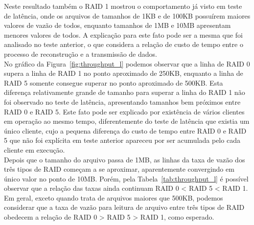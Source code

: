 	Neste resultado também o RAID 1 mostrou o comportamento já visto em teste de latência, onde os arquivos de tamanhos de 1KB e de 100KB possuírem maiores valores de vazão de todos, enquanto tamanhos de 1MB e 10MB apresentam menores valores de todos. A explicação para este fato pode ser a mesma que foi analisado no teste anterior, o que considera a relação de custo de tempo entre o processo de reconstrução e a transmissão de dados.
	\\
	
	No gráfico da Figura~\ref{fig:throughput_l} podemos observar que a linha de RAID 0 supera a linha de RAID 1 no ponto aproximado de 250KB, enquanto a linha de  RAID 5 somente consegue superar no ponto aproximado de 500KB. 
	Esta diferença relativamente grande de tamanho para superar a linha do RAID 1 não foi observado no teste de latência, apresentando tamanhos bem próximos entre RAID 0 e RAID 5. Este fato pode ser explicado por existência de vários clientes em operação ao mesmo tempo, diferentemente do teste de latência que existia um único cliente, cujo a pequena diferença do custo de tempo entre RAID 0 e RAID 5 que não foi explícita em teste anterior apareceu por ser acumulada pelo cada cliente em execução.
	\\
	
	Depois que o tamanho do arquivo passa de 1MB, as linhas da taxa de vazão dos três tipos de RAID começam a se aproximar, aparentemente convergindo em único valor no ponto de 10MB. Porém, pela Tabela~\ref{tab:throughput_l} é possível observar que a relação das taxas ainda continuam RAID 0 < RAID 5 < RAID 1.
	\\
	
	Em geral, exceto quando trata de arquivos maiores que 500KB, podemos considerar que a taxa de vazão para leitura de arquivo entre três tipos de RAID obedecem a relação de RAID 0 > RAID 5 > RAID 1, como esperado.
	\\
	
